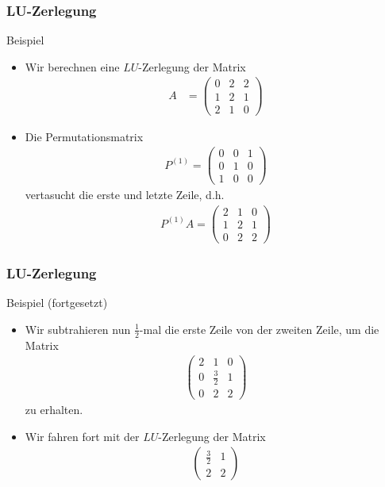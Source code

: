 \documentclass{beamer}
\newcommand{\mytitle}{LU-Zerlegung}
\begin{document}
\begin{frame}\frametitle{\mytitle}
	\begin{block}{Beispiel}
		\begin{itemize}
			\item Wir berechnen eine $LU$-Zerlegung der Matrix
				\begin{align*}
					A&=\begin{pmatrix} 0&2&2\\ 1&2&1\\ 2&1&0 \end{pmatrix}
				\end{align*}
			\item Die Permutationsmatrix
				\begin{align*}
					P^{(1)}=\begin{pmatrix}
						0&0&1\\
						0&1&0\\
						1&0&0
					\end{pmatrix}
				\end{align*}
				vertasucht die erste und letzte Zeile, d.h.\
				\begin{align*}
					P^{(1)}A=\begin{pmatrix} 2&1&0\\ 1&2&1\\ 0&2&2  \end{pmatrix}
				\end{align*}
		\end{itemize}
	\end{block}
\end{frame}

\begin{frame}\frametitle{\mytitle}
	\begin{block}{Beispiel (fortgesetzt)}
		\begin{itemize}
			\item Wir subtrahieren nun $\frac{1}{2}$-mal die erste Zeile von der zweiten Zeile, um die Matrix
				\begin{align*}
					\begin{pmatrix}
						2&1&0\\
						0&\frac{3}{2}&1\\
						0&2&2
					\end{pmatrix}
				\end{align*}
				zu erhalten.
			\item Wir fahren fort mit der $LU$-Zerlegung der Matrix
				\begin{align*}
				\begin{pmatrix}
					\frac{3}{2}&1\\2&2
				\end{pmatrix}
				\end{align*}
		\end{itemize}
	\end{block}
\end{frame}
\end{document}
